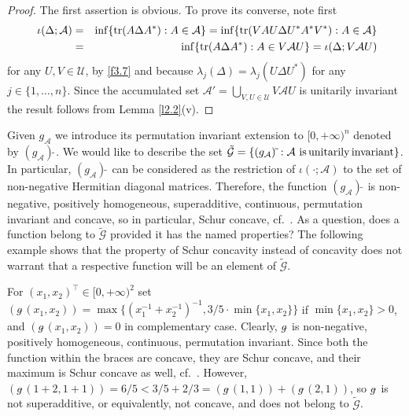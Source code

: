 \documentclass{amsart}
\begin{document}
\begin{proof}       
The first assertion is obvious. To prove its converse, note first
\begin{eqnarray} \label{f3.8}
    \, \, \iota( \Delta ; {\mathcal A}) & = & \inf \{ {\rm tr}(A \Delta A^*) : A \in {\mathcal A } \} =  \inf \{ {\rm tr}(VAU \Delta U^*A^*V^*) : A \in {\mathcal A}  \} \\
                                          & = & \inf \{ {\rm tr}(A \Delta A^*) : A \in V {\mathcal A} U \} = \iota( \Delta ; V{\mathcal A}U ) \nonumber
\end{eqnarray}    
for any $U,V \in {\mathcal U}$, by \eqref{f3.7} and because $\lambda_j(\Delta) = \lambda_j(U \Delta U^*)$ for any $j \in \{ 1, \ldots , n\}$. Since the accumulated set ${\mathcal A}'= \bigcup_{V,U \in {\mathcal U}} V {\mathcal A} U$ is unitarily invariant the result follows from Lemma \ref{l2.2}(v).
\end{proof}

Given $g_{\mathcal A}$ we introduce its permutation invariant extension to $[0,+\infty)^n$ denoted by $({g}_{\mathcal A})\tilde{\,}$. We would like to describe the set  $\tilde{{\mathcal G}} = \{ ({g}_{\mathcal A})\tilde{\,}: {\mathcal A} \,\, {\rm is} \, {\rm unitarily} \, {\rm invariant} \}$. In particular, $({g}_{\mathcal A})\tilde{\,}$ can be considered as the restriction of $\iota( \cdot ; {\mathcal A})$ to the set of non-negative Hermitian diagonal matrices. Therefore, the function $({g}_{\mathcal A})\tilde{\,}$ is non-negative, positively homogeneous, superadditive, continuous, permutation invariant and concave, so in particular, Schur concave, cf.~\cite[Prop.~3.C.2]{MOA}. As a question, does a function belong to $\tilde{{\mathcal G}}$ provided it has the named properties? The following example shows that the property of Schur concavity instead of concavity does not warrant that a respective function will be an element of $\tilde{{\mathcal G}}$.

\begin{exe} \label{e3.7}
For $(x_1,x_2)^\top\in [0,+\infty)^2$ set $({g}\tilde{\,}(x_1,x_2)) = \max \{ (x_1^{-1}+x_2^{-1})^{-1}, 3/5 \cdot \min \{ x_1, x_2 \} \}$ if $\min \{ x_1, x_2\} > 0$, and $({g}\tilde{\,}(x_1,x_2))=0$ in complementary case. Clearly, $g\tilde{\,}$ is non-negative, positively homogeneous, continuous, permutation invariant. Since both the function within the braces are concave, they are Schur concave, and their maximum is Schur concave as well, cf.~\cite[3.B.1.c]{MOA}. However, $({g}\tilde{\,}(1+2,1+1)) = 6/5 < 3/5+2/3 = ({g}\tilde{\,}(1,1)) + ({g}\tilde{\,}(2,1))$, so $g\tilde{\,}$ is not superadditive, or equivalently, not concave, and does not belong to $\tilde{{\mathcal G}}$. 
\end{exe}
\end{document}
